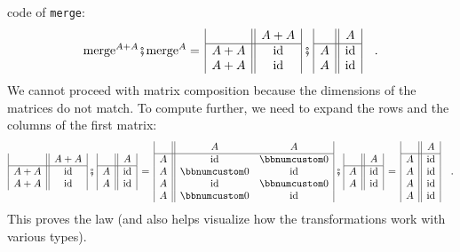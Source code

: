 code of \lstinline!merge!:
\[
\text{merge}^{A+A}\bef\text{merge}^{A}=\,\begin{array}{|c||c|}
 & A+A\\
\hline A+A & \text{id}\\
A+A & \text{id}
\end{array}\,\bef\,\begin{array}{|c||c|}
 & A\\
\hline A & \text{id}\\
A & \text{id}
\end{array}\quad.
\]
We cannot proceed with matrix composition because the dimensions of
the matrices do not match. To compute further, we need to expand the
rows and the columns of the first matrix:
\[
\begin{array}{|c||c|}
 & A+A\\
\hline A+A & \text{id}\\
A+A & \text{id}
\end{array}\,\bef\,\begin{array}{|c||c|}
 & A\\
\hline A & \text{id}\\
A & \text{id}
\end{array}\,=\,\begin{array}{|c||cc|}
 & A & A\\
\hline A & \text{id} & \bbnum 0\\
A & \bbnum 0 & \text{id}\\
A & \text{id} & \bbnum 0\\
A & \bbnum 0 & \text{id}
\end{array}\,\bef\,\begin{array}{|c||c|}
 & A\\
\hline A & \text{id}\\
A & \text{id}
\end{array}\,=\,\begin{array}{|c||c|}
 & A\\
\hline A & \text{id}\\
A & \text{id}\\
A & \text{id}\\
A & \text{id}
\end{array}\quad.
\]
This proves the law (and also helps visualize how the transformations
work with various types).


